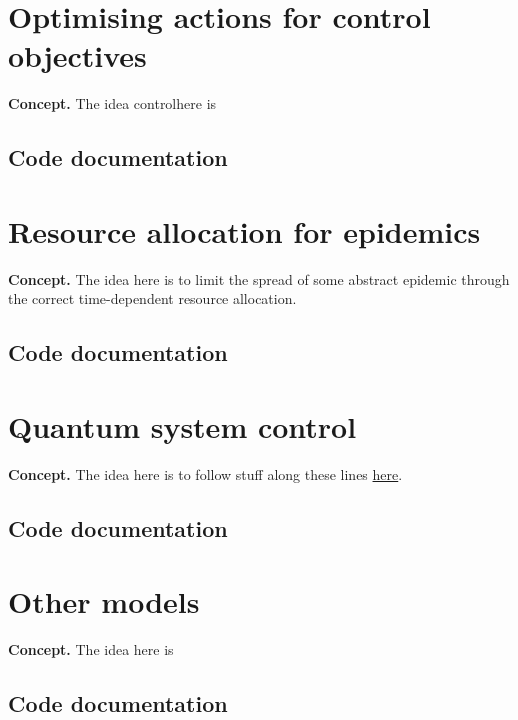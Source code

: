 \documentclass{book}
\begin{document}
\chapter{\sffamily Optimising actions for control objectives}

{\bfseries\sffamily Concept.} The idea  controlhere is 

\section{\sffamily Code documentation}

\chapter{\sffamily Resource allocation for epidemics}

{\bfseries\sffamily Concept.} The idea here is to limit the spread of some abstract epidemic through the correct time-dependent resource allocation.

\section{\sffamily Code documentation}

\chapter{\sffamily Quantum system control}

{\bfseries\sffamily Concept.} The idea here is to follow stuff along these lines \href{https://arxiv.org/pdf/1210.7127.pdf}{here}.

\section{\sffamily Code documentation}

\chapter{\sffamily Other models}

{\bfseries\sffamily Concept.} The idea here is

\section{\sffamily Code documentation}



\backmatter


\end{document}
